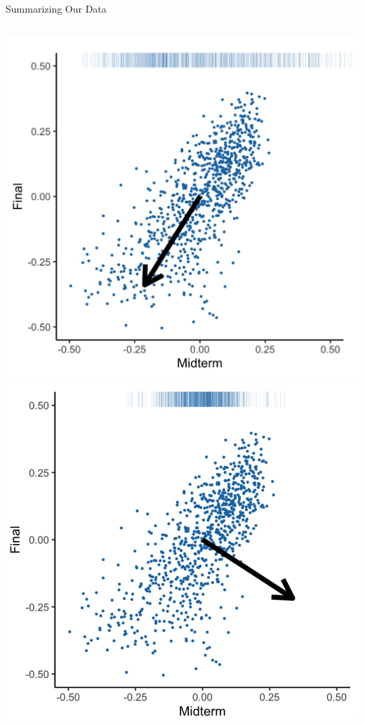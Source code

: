 \documentclass[aspectratio=169]{../latex_main/tntbeamer}  %
\begin{document}
\begin{frame}{Summarizing Our Data}
\begin{columns}
	        \begin{column}{.5\textwidth}
	                    \centering
	                    \includegraphics[scale=.1]{vect1}
	                    \includegraphics[scale=.1]{vect2}

\end{column}
\end{columns}
\end{frame}
\end{document}
